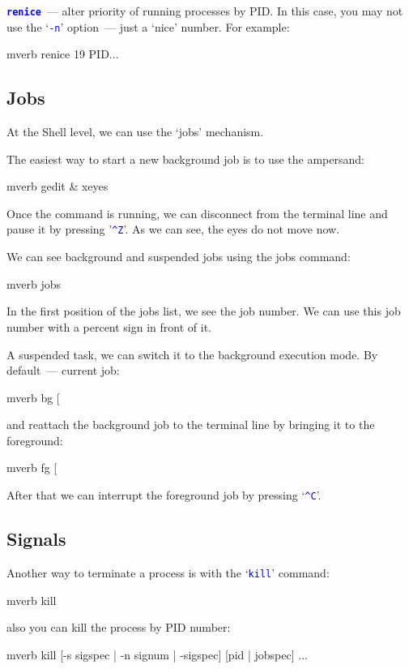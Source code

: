 \documentclass[12pt]{report}
\newcommand{\cmd}[1]{\textcolor{blue}{\tt #1}}
\begin{document}
{\bf\cmd{renice}}~--- alter priority of running processes by PID. In this
case, you may not use the `\cmd{-n}' option~--- just a `nice' number.
For example:
\begin{code}{mverb}
renice 19 PID...
\end{code}

\subsection*{Jobs}

At the Shell level, we can use the `jobs' mechanism.

The easiest way to start a new background job is to use the ampersand:
\begin{code}{mverb}
gedit &
xeyes
\end{code}

Once the command is running, we can disconnect from the terminal line and
pause it by pressing '\cmd{\^{}Z}'. As we can see, the eyes do not move now.

We can see background and suspended jobs using the jobs command:
\begin{code}{mverb}
jobs
\end{code}

In the first position of the jobs list, we see the job number. We can use
this job number with a percent sign in front of it.

A suspended task, we can switch it to the background execution mode. By
default~--- current job:
\begin{code}{mverb}
bg [%
\end{code}
and reattach the background job to the terminal line by bringing it to
the foreground:
\begin{code}{mverb}
fg [%
\end{code}
After that we can interrupt the foreground job by pressing `\cmd{\^{}C}'.

\subsection*{Signals}

Another way to terminate a process is with the `\cmd{kill}' command:
\begin{code}{mverb}
kill %
\end{code}
also you can kill the process by PID number:
\begin{code}{mverb}
kill [-s sigspec | -n signum | -sigspec] [pid | jobspec] ...
\end{code}
\end{document}
